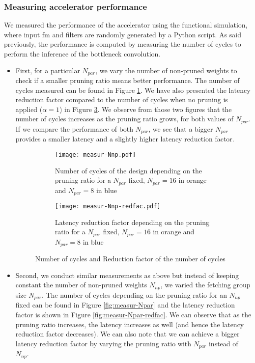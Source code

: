 \subsubsection{Measuring accelerator performance}
%
We measured the performance of the accelerator using the functional simulation, where input \acrshort{fm} and filters are randomly generated by a Python script. As said previously, the performance is computed by measuring the number of cycles to perform the inference of the bottleneck convolution.
%
\begin{itemize}
    \item First, for a particular $N_{par}$, we vary the number of non-pruned weights to check if a smaller pruning ratio means better performance. The number of cycles measured can be found in Figure \ref{fig:measur-Nnp}. We have also presented the latency reduction factor compared to the number of cycles when no pruning is applied ($\alpha = 1$) in Figure \ref{fig:measur-Nnp-redfac}. We observe from those two figures that the number of cycles increases as the pruning ratio grows, for both values of $N_{par}$. If we compare the performance of both $N_{par}$, we see that a bigger $N_{par}$ provides a smaller latency and a slightly higher latency reduction factor.
    \begin{figure}[H]
        \centering
        \begin{subfigure}[t]{.49\textwidth}
            \centering
            \texttt{[image: measur-Nnp.pdf]}
            \caption{Number of cycles of the design depending on the pruning ratio for a $N_{par}$ fixed, $N_{par} = 16$ in orange and $N_{par} = 8$ in blue}
            \label{fig:measur-Nnp}
        \end{subfigure}
        \begin{subfigure}[t]{.49\textwidth}
            \centering
            \texttt{[image: measur-Nnp-redfac.pdf]}
            \caption{Latency reduction factor depending on the pruning ratio for a $N_{par}$ fixed, $N_{par} = 16$ in orange and $N_{par} = 8$ in blue}
            \label{fig:measur-Nnp-redfac}
        \end{subfigure}
        \caption{Number of cycles and Reduction factor of the number of cycles}
    \end{figure}
    \item Second, we conduct similar measurements as above but instead of keeping constant the number of non-pruned weights $N_{np}$, we varied the fetching group size $N_{par}$. The number of cycles depending on the pruning ratio for an $N_{np}$ fixed can be found in Figure \ref{fig:measur-Npar} and the latency reduction factor is shown in Figure \ref{fig:measur-Npar-redfac}. We can observe that as the pruning ratio increases, the latency increases as well (and hence the latency reduction factor decreases). We can also note that we can achieve a bigger latency reduction factor by varying the pruning ratio with $N_{par}$ instead of $N_{np}$.

\end{itemize}
